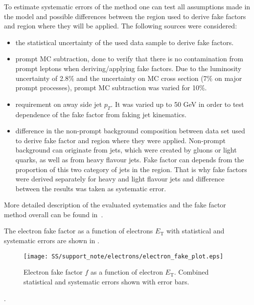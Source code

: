 To estimate systematic errors of the method one can test all assumptions made in the model and possible differences between the region used to derive 
fake factors and region where they will be applied. The following sources were considered:
\begin{itemize}
 \item the statistical uncertainty of the used data sample to derive fake factors.
 \item prompt MC subtraction, done to verify that there is no contamination from prompt leptons when deriving/applying fake factors.
 Due to the luminosity uncertainty of 2.8$\%$ and the uncertainty on MC cross section (7$\%$ on major prompt processes), prompt MC subtraction
 was varied for 10$\%$.
 \item requirement on away side jet $p_T$. It was varied up to 50 GeV in order to test dependence of the fake factor from faking jet kinematics.
 \item difference in the non-prompt background composition between data set used to derive fake factor and region where they were applied.
 Non-prompt background can originate from jets, which were created by gluons or light quarks, as well as from heavy flavour jets.
 Fake factor can depends from the proportion of this two category of jets in the region. That is why fake factors were derived separately
 for heavy and light flavour jets and difference between the results was taken as systematic error.
\end{itemize}
More detailed description of the evaluated systematics and the fake factor method overall can be found in~\cite{anthony_thesis}.

The electron fake factor as a function of electrons $E_\mathrm{T}$ with statistical and systematic errors are
shown in .
\begin{figure}[h]
\begin{center}
\texttt{[image: SS/support\_note/electrons/electron\_fake\_plot.eps]}
\caption{Electron fake factor $f$ as a function of electron $E_\mathrm{T}$. Combined statistical and systematic errors shown with error bars.}
\label{fig:ff_e_errs}
\end{center}
\end{figure} 
.

